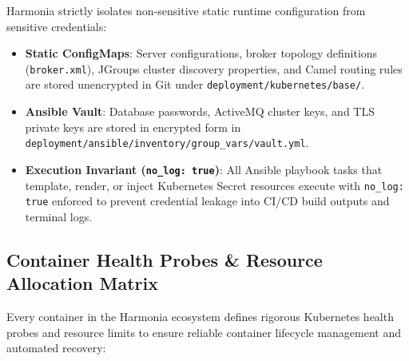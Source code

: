 Harmonia strictly isolates non-sensitive static runtime configuration from sensitive credentials:
\begin{itemize}
    \item \textbf{Static ConfigMaps}: Server configurations, broker topology definitions (\texttt{broker.xml}), JGroups cluster discovery properties, and Camel routing rules are stored unencrypted in Git under \texttt{deployment/kubernetes/base/}.
    \item \textbf{Ansible Vault}: Database passwords, ActiveMQ cluster keys, and TLS private keys are stored in encrypted form in \texttt{deployment/ansible/inventory/group\_vars/vault.yml}.
    \item \textbf{Execution Invariant (\texttt{no\_log: true})}: All Ansible playbook tasks that template, render, or inject Kubernetes Secret resources execute with \texttt{no\_log: true} enforced to prevent credential leakage into CI/CD build outputs and terminal logs.
\end{itemize}

\subsection{Container Health Probes \& Resource Allocation Matrix}

Every container in the Harmonia ecosystem defines rigorous Kubernetes health probes and resource limits to ensure reliable container lifecycle management and automated recovery:

